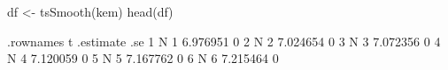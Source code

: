 \begin{Schunk}
\begin{Sinput}
 df <- tsSmooth(kem)
 head(df)
\end{Sinput}
\begin{Soutput}
  .rownames t .estimate .se
1         N 1  6.976951   0
2         N 2  7.024654   0
3         N 3  7.072356   0
4         N 4  7.120059   0
5         N 5  7.167762   0
6         N 6  7.215464   0
\end{Soutput}
\end{Schunk}
